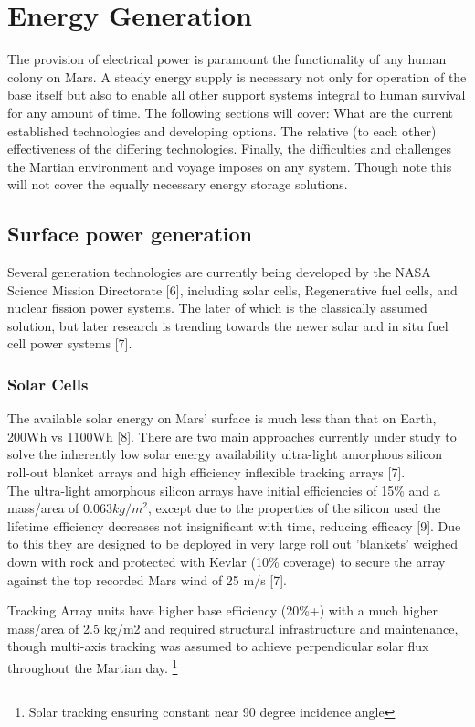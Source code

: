 \documentclass[12pt]{article}
\begin{document}
\section{Energy Generation}
The provision of electrical power is paramount the functionality of any human colony on Mars. A steady energy supply is necessary not only for operation of the base itself but also to enable all other support systems integral to human survival for any amount of time. The following sections will cover: What are the current established technologies and developing options. The relative (to each other) effectiveness of the differing technologies. Finally, the difficulties and challenges the Martian environment and voyage imposes on any system. Though note this will not cover the equally necessary energy storage solutions.

\subsection{Surface power generation}
Several generation technologies are currently being developed by the NASA Science Mission Directorate [6], including solar cells, Regenerative fuel cells, and nuclear fission power systems. The later of which is the classically assumed solution, but later research is trending towards the newer solar and in situ fuel cell power systems [7].

\subsubsection*{Solar Cells}
The available solar energy on Mars' surface is much less than that on Earth, 200Wh vs 1100Wh [8]. There are two main approaches currently under study to solve the inherently low solar energy availability ultra-light amorphous silicon roll-out blanket arrays and high efficiency inflexible tracking arrays [7].\\

The ultra-light amorphous silicon arrays have initial efficiencies of 15\% and a mass/area of $0.063 kg/m^{2}$, except due to the properties of the silicon used the lifetime efficiency decreases not insignificant with time, reducing efficacy [9]. Due to this they are designed to be deployed in very large roll out 'blankets' weighed down with rock and protected with Kevlar (10\% coverage) to secure the array against the top recorded
Mars wind of 25 m/s [7].

Tracking Array units have higher base efficiency (20\%+) with a much higher mass/area of 2.5 kg/m2 and required structural infrastructure and maintenance, though  multi-axis tracking was
assumed to achieve perpendicular solar flux throughout the Martian day. \footnote{Solar tracking ensuring constant near 90 degree incidence angle}
\end{document}
